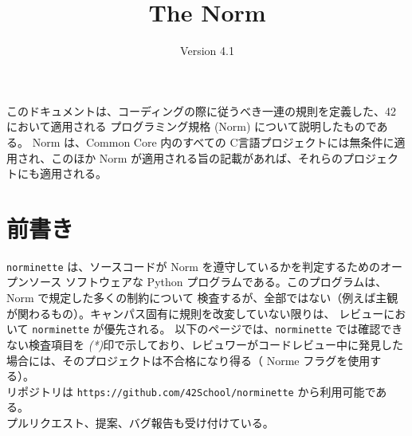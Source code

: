 \documentclass{42-ja}
\begin{document}
\title{The Norm}
\subtitle{Version 4.1}

\summary
{
    このドキュメントは、コーディングの際に従うべき一連の規則を定義した、42 において適用される
      プログラミング規格 (Norm) について説明したものである。
    Norm は、Common Core 内のすべての C言語プロジェクトには無条件に適用され、このほか Norm 
      が適用される旨の記載があれば、それらのプロジェクトにも適用される。
}

\maketitle

\tableofcontents



\chapter{前書き}

\texttt{norminette} は、ソースコードが Norm を遵守しているかを判定するためのオープンソース
  ソフトウェアな Python プログラムである。このプログラムは、Norm で規定した多くの制約について
  検査するが、全部ではない（例えば主観が関わるもの）。キャンパス固有に規則を改変していない限りは、
  レビューにおいて \texttt{norminette} が優先される。 以下のページでは、\texttt{norminette}
  では確認できない検査項目を \textit{(*)}印で示しており、レビュワーがコードレビュー中に発見した
  場合には、そのプロジェクトは不合格になり得る（ Norme フラグを使用する）。\\

リポジトリは \texttt{https://github.com/42School/norminette} から利用可能である。\\

プルリクエスト、提案、バグ報告も受け付けている。

\newpage


%
%
\end{document}
